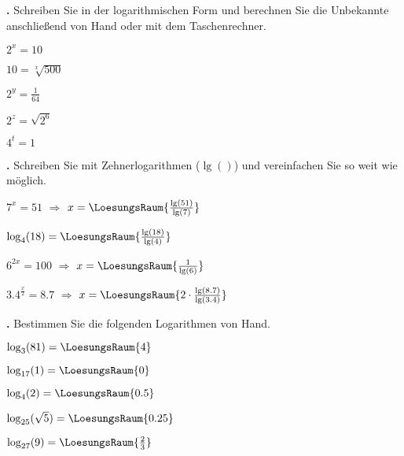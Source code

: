 \newpage

\textbf{\bbwAufgabenNummer{}.}
Schreiben Sie in der logarithmischen Form und berechnen Sie die
Unbekannte anschließend von Hand oder mit dem Taschenrechner.

\begin{bbwAufgabenBlock}
\item $2^x = 10$   
\item $10=\sqrt[x]{500}$ 

\item $2^y = \frac{1}{64}$   
\item $2^z = \sqrt{2^6}$   
\item $4^t= 1$   
\end{bbwAufgabenBlock}

\newpage

\textbf{\bbwAufgabenNummer{}.}
Schreiben Sie mit Zehnerlogarithmen ($\lg()$) und vereinfachen Sie so weit wie möglich.

\begin{bbwAufgabenBlock}
\item $7^x = 51$   $\Longrightarrow$ $x=\LoesungsRaum{ \frac{\lg(51)}{\lg(7)}}$
\item $\log_4(18) = \LoesungsRaum{\frac{\lg(18)}{\lg(4)}}$
\item $6^{2x} = 100$   $\Longrightarrow$ $x=\LoesungsRaum{ \frac1{\lg(6)}}$
\item $3.4^{\frac{x}{2}} = 8.7$   $\Longrightarrow$ $x=\LoesungsRaum{ 2\cdot{} \frac{\lg(8.7)}{\lg(3.4)} }$

\end{bbwAufgabenBlock}



\newpage

\textbf{\bbwAufgabenNummer{}.}
Bestimmen Sie die folgenden Logarithmen von Hand.

\begin{bbwAufgabenBlock}
\item $\log_3(81)     =    \LoesungsRaum{4}$
\item $\log_{17}(1)     =    \LoesungsRaum{0}$
\item $\log_4(2)     =    \LoesungsRaum{0.5}$
\item $\log_{25}(\sqrt{5})     =    \LoesungsRaum{0.25}$
\item $\log_{27}(9)     =    \LoesungsRaum{\frac23}$
\end{bbwAufgabenBlock}

